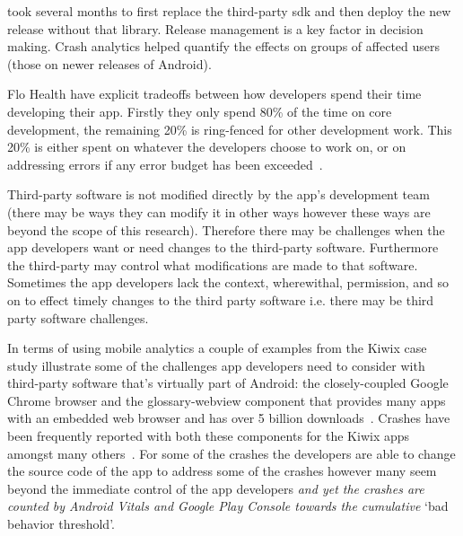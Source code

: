  took several months to first replace the third-party  \Gls{sdk} and then deploy the new release without that library.
Release management is a key factor in decision making. Crash analytics helped quantify the effects on groups of affected users (those on newer releases of Android).

Flo Health have explicit tradeoffs between how developers spend their time developing their app. Firstly they only spend 80\% of the time on core development, the remaining 20\% is ring-fenced for other development work. This 20\% is either spent on whatever the developers choose to work on, or on addressing errors if any error budget has been exceeded~.


Third-party software is not modified directly by the app's development team (there may be ways they can modify it in other ways however these ways are beyond the scope of this research). Therefore there may be challenges when the app developers want or need changes to the third-party software. Furthermore the third-party may control what modifications are made to that software. Sometimes the app developers lack the context, wherewithal, permission, and so on to effect timely changes to the third party software i.e. there may be third party software challenges.

In terms of using mobile analytics a couple of examples from the Kiwix case study illustrate some of the challenges app developers need to consider with third-party software that's virtually part of Android: the closely-coupled Google Chrome browser and the \Gls{glossary-webview} component that provides many apps with an embedded web browser and has over 5 billion downloads~. Crashes have been frequently reported with both these components for the Kiwix apps amongst many others~. For some of the crashes the developers are able to change the source code of the app to address some of the crashes however many seem beyond the immediate control of the app developers \emph{and yet the crashes are counted by Android Vitals and Google Play Console towards the cumulative} `bad behavior threshold'. 

